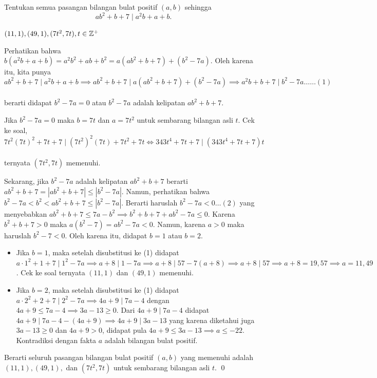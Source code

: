 \documentclass[12pt]{scrartcl}
\begin{document}
	\begin{soalbaru} Tentukan semua pasangan bilangan bulat positif $(a,b)$ sehingga\\[-18pt] $$ab^2+b+7 \mid a^2b+a+b.$$
	\begin{jawaban}
	$(11,1),(49,1),(7t^2,7t), t \in \mathbb Z^+$
	\end{jawaban}
	\begin{solusi}
	Perhatikan bahwa $b(a^2b+a+b)=a^2b^2+ab+b^2=a(ab^2+b+7)+(b^2-7a)$. Oleh karena itu, kita punya\\[-20pt]$$ab^2+b+7 \mid a^2b+a+b \implies ab^2+b+7 \mid a(ab^2+b+7)+(b^2-7a) \implies a^2b+b+7 \mid b^2-7a \dots \dots (1)$$\\[-20pt] berarti didapat $b^2-7a=0$ atau $b^2-7a$ adalah kelipatan $ab^2+b+7$.
	
	Jika $b^2-7a=0$ maka $b=7t$ dan $a=7t^2$ untuk sembarang bilangan asli $t$. Cek ke soal,\\[-17pt]$$7t^2(7t)^2+7t+7 \mid (7t^2)^2(7t)+7t^2+7t \iff 343t^4+7t+7 \mid (343t^4+7t+7)t $$\\[-25pt] ternyata $(7t^2,7t)$ memenuhi.
	
	Sekarang, jika $b^2-7a$ adalah kelipatan $ab^2+b+7$ berarti $ab^2+b+7=|ab^2+b+7|\le |b^2-7a|$. Namun, perhatikan bahwa $b^2-7a < b^2 < ab^2+b+7 \le |b^2-7a|$. Berarti haruslah $b^2-7a<0 \dots (2)$ yang menyebabkan $ab^2+b+7 \le 7a-b^2 \implies b^2+b+7+ab^2-7a \le 0$. Karena $b^2+b+7 >0$ maka $a(b^2-7)=ab^2-7a<0$. Namun, karena $a>0$ maka haruslah $b^2-7<0$. Oleh karena itu, didapat $b=1$ atau $b=2$.
	
	\begin{itemize}
	\item Jika $b=1$, maka setelah disubstitusi ke (1) didapat $a\cdot 1^2+1+7 \mid 1^2 - 7a \implies a+8 \mid 1-7a \implies a+8 \mid 57-7(a+8) \implies a+8\mid 57 \implies a+8=19,57 \implies a=11,49$. Cek ke soal ternyata $(11,1)$ dan $(49,1)$ memenuhi.
		
	\item Jika $b=2$, maka setelah disubstitusi ke (1) didapat $a\cdot 2^2+2+7 \mid 2^2 -7a \implies 4a+9 \mid 7a-4 $ dengan $4a+9 \le 7a-4 \implies 3a-13 \ge 0$. Dari $4a+9 \mid 7a-4$ didapat $4a+9 \mid 7a-4 - (4a+9) \implies 4a+9 \mid 3a-13$ yang karena diketahui juga $3a-13 \ge 0$ dan $4a+9>0$, didapat pula $4a+9 \le 3a-13 \implies a \le -22$. Kontradiksi dengan fakta $a$ adalah bilangan bulat positif.
	\end{itemize}
	
	Berarti seluruh pasangan bilangan bulat positif $(a,b)$ yang memenuhi adalah $(11,1),(49,1),$ dan $(7t^2,7t)$ untuk sembarang bilangan asli $t$. \qed
	\end{solusi}
	
	\end{soalbaru}
	
\end{document}
